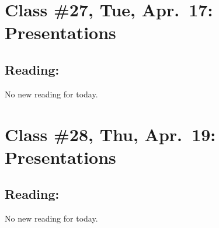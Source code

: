 \documentclass[]{article}
\begin{document}
\hypertarget{class-27-tue-apr.17-presentations}{%
\section{Class \#27, Tue, Apr.~17:
Presentations}\label{class-27-tue-apr.17-presentations}}

\hypertarget{reading-26}{%
\subsection{Reading:}\label{reading-26}}

No new reading for today.

\hypertarget{class-28-thu-apr.19-presentations}{%
\section{Class \#28, Thu, Apr.~19:
Presentations}\label{class-28-thu-apr.19-presentations}}

\hypertarget{reading-27}{%
\subsection{Reading:}\label{reading-27}}

No new reading for today.
\end{document}
